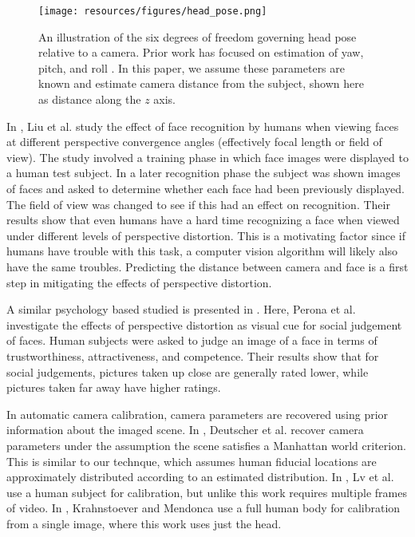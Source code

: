 \documentclass[runningheads]{llncs}
\begin{document}
\begin{figure}[ht]
\centering
\texttt{[image: resources/figures/head\_pose.png]}
\caption{
An illustration of the six degrees of freedom governing head pose relative to a camera.
Prior work has focused on estimation of yaw, pitch, and roll \cite{murphy2009head}.
In this paper, we assume these parameters are known and estimate camera distance from the subject, shown here as distance along the $z$ axis.
}
\label{fig:head_pose}
\end{figure}

In \cite{liu2003face,liu2006face}, Liu et al. study the effect of face recognition by humans when viewing faces at different perspective convergence angles (effectively focal length or field of view). 
The study involved a training phase in which face images were displayed to a human test subject.
In a later recognition phase the subject was shown images of faces and asked to determine whether each face had been previously displayed.
The field of view was changed to see if this had an effect on recognition. 
Their results show that even humans have a hard time recognizing a face when viewed under different levels of perspective distortion.  
This is a motivating factor since if humans have trouble with this task, a computer vision algorithm will likely also have the same troubles.  
Predicting the distance between camera and face is a first step in mitigating the effects of perspective distortion.

A similar psychology based studied is presented in \cite{perona2007new,bryan2012perspective}. 
Here, Perona et al. investigate the effects of perspective distortion as visual cue for social judgement of faces.  
Human subjects were asked to judge an image of a face in terms of trustworthiness, attractiveness, and competence.  
Their results show that for social judgements, pictures taken up close are generally rated lower, while pictures taken far away have higher ratings.

In automatic camera calibration, camera parameters are recovered using prior information about the imaged scene.
In \cite{deutscher2002automatic}, Deutscher et al. recover camera parameters under the assumption the scene satisfies a Manhattan world criterion.
This is similar to our technque, which assumes human fiducial locations are approximately distributed according to an estimated distribution. 
In \cite{lv2006camera}, Lv et al. use a human subject for calibration, but unlike this work requires multiple frames of video.
In \cite{krahnstoever2005bayesian}, Krahnstoever and Mendonca use a full human body for calibration from a single image, where this work uses just the head.
\end{document}
